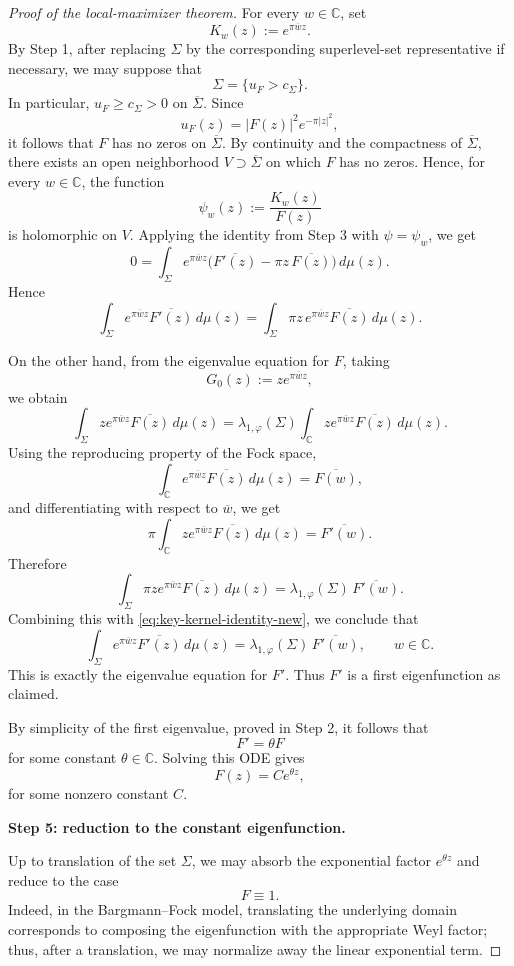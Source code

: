 \documentclass[a4paper,11pt,reqno]{amsart}
\numberwithin{equation}{section}
\theoremstyle{plain} %
\theoremstyle{definition} %
\theoremstyle{remark}
\newcommand{\C}{\mathbb{C}}
\begin{document}
\begin{proof}[Proof of the local-maximizer theorem]
For every \(w\in \C\), set
\[
K_w(z):=e^{\pi \overline wz}.
\]
By Step 1, after replacing \(\Sigma\) by the corresponding superlevel-set
representative if necessary, we may suppose that
\[
\Sigma=\{u_F>c_\Sigma\}.
\]
In particular, \(u_F\ge c_\Sigma>0\) on \(\overline \Sigma\). Since
\[
u_F(z)=|F(z)|^2e^{-\pi |z|^2},
\]
it follows that \(F\) has no zeros on \(\overline \Sigma\). By continuity and the
compactness of \(\overline \Sigma\), there exists an open neighborhood
\(V\supset \overline \Sigma\) on which \(F\) has no zeros. Hence, for every
\(w\in \C\), the function
\[
\psi_w(z):=\frac{K_w(z)}{F(z)}
\]
is holomorphic on \(V\). Applying the identity from Step 3 with \(\psi=\psi_w\),
we get
\[
0=
\int_\Sigma
e^{\pi \overline wz}
\Big(\overline{F'(z)}-\pi z\,\overline{F(z)}\Big)\,d\mu(z).
\]
Hence
\begin{equation}\label{eq:key-kernel-identity-new}
\int_\Sigma
e^{\pi \overline wz}\overline{F'(z)}\,d\mu(z)
=
\int_\Sigma
\pi z\,e^{\pi \overline wz}\overline{F(z)}\,d\mu(z).
\end{equation}

On the other hand, from the eigenvalue equation for \(F\), taking
\[
G_0(z):=z e^{\pi \overline wz},
\]
we obtain
\[
\int_\Sigma z e^{\pi \overline wz}\overline{F(z)}\,d\mu(z)
=
\lambda_{1,\varphi}(\Sigma)\int_\C z e^{\pi \overline wz}\overline{F(z)}\,d\mu(z).
\]
Using the reproducing property of the Fock space,
\[
\int_\C e^{\pi \overline wz}\overline{F(z)}\,d\mu(z)=\overline{F(w)},
\]
and differentiating with respect to \(\overline w\), we get
\[
\pi\int_\C z e^{\pi \overline wz}\overline{F(z)}\,d\mu(z)=\overline{F'(w)}.
\]
Therefore
\[
\int_\Sigma \pi z e^{\pi \overline wz}\overline{F(z)}\,d\mu(z)
=
\lambda_{1,\varphi}(\Sigma)\,\overline{F'(w)}.
\]
Combining this with \eqref{eq:key-kernel-identity-new}, we conclude that
\[
\int_\Sigma e^{\pi \overline wz}\overline{F'(z)}\,d\mu(z)
=
\lambda_{1,\varphi}(\Sigma)\,\overline{F'(w)},
\qquad w\in \C.
\]
This is exactly the eigenvalue equation for \(F'\). Thus \(F'\) is a first
eigenfunction as claimed.

By simplicity of the first eigenvalue, proved in Step 2, it follows that
\[
F'=\theta F
\]
for some constant \(\theta\in \C\). Solving this ODE gives
\[
F(z)=C e^{\theta z},
\]
for some nonzero constant \(C\).

\medskip
\noindent
{\bf Step 5: reduction to the constant eigenfunction.}

Up to translation of the set \(\Sigma\), we may absorb the exponential factor
\(e^{\theta z}\) and reduce to the case
\[
F\equiv 1.
\]
Indeed, in the Bargmann--Fock model, translating the underlying domain corresponds
to composing the eigenfunction with the appropriate Weyl factor; thus, after a
translation, we may normalize away the linear exponential term.


\end{proof}
\end{document}
